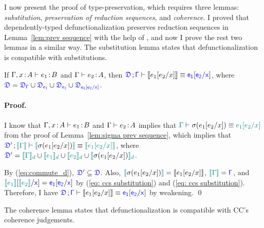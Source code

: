 
I now present the proof of type-preservation, which requires three lemmas: \textit{substitution}, \textit{preservation of reduction sequences}, and \textit{coherence}. I proved that dependently-typed defunctionalization preserves reduction sequences in Lemma~\ref{lem:prev sequence} with the help of {\ccs}, and now I prove the rest two lemmas in a similar way. The substitution lemma states that defunctionalization is compatible with substitutions.

\begin{lemma}[Substitution] 

If $\Gamma, x \hspace{0.5mm}{:}\hspace{0.5mm} A \vdash e_1 \hspace{0.5mm}{:}\hspace{0.5mm} B$ and $\Gamma \vdash e_2 \hspace{0.5mm}{:}\hspace{0.5mm} A$, then $\target{\fdef} \semicolon \target{\Gamma} \vdash \bbracket{e_1 \sub{e_2}{x}} \equiv \target{e_1}\sub{\target{e_2}}{\target{x}}$, where $\target{\fdef} = \target{\fdef_{\Gamma}} \cup \target{\fdef_{e_1}} \cup \target{\fdef_{e_2}} \cup \target{\fdef_{e_1\sub{e_2}{x}}}$.
\paragraph{Proof.} I know that $\Gamma, x \hspace{0.5mm}{:}\hspace{0.5mm} A \vdash e_1 \hspace{0.5mm}{:}\hspace{0.5mm} B$ and $\Gamma \vdash e_2 \hspace{0.5mm}{:}\hspace{0.5mm} A$ implies that $\color{teal}{\Gamma}\color{black} \vdash \sigma(e_1[e_2\slash x]) \equiv \color{teal}{e_1[e_2\slash x]}\color{black}$ from the proof of Lemma~\ref{lem:sigma prev sequence}, which implies that $\target{\fdef'} \semicolon \hbracket{\helper{\Gamma}} \vdash \hbracket{\sigma(e_1\sub{e_2}{x})} \equiv \hbracket{\helper{e_1\sub{e_2}{x}}}$, where 
$\target{\fdef'} = \hbracketd{\helper{\Gamma}} \cup \hbracketd{\helper{e_1}} \cup \hbracketd{\helper{e_2}} \cup \hbracketd{\sigma(e_1\sub{e_2}{x})}$.

By (\ref{eq:commute_d}), $\target{\fdef'} \subseteq \target{\fdef}$. Also, $\color{teal}{[\![}\color{black}{\sigma(e_1[e_2\slash x])}\color{teal}{]\!]}\color{black} = {[\![ e_1[e_2\slash x] ]\!]}$, $\hbracket{\helper{\Gamma}} = \target{\Gamma}$, and $\hbracket{\helper{e_1}}\sub{\hbracket{\helper{e_2}}}{\target{x}} = \target{e_1}\targetsub{e_2}{x}$ by (\ref{eq: ccs substitution}) and (\ref{eq: ccs substitution}). Therefore, I have $\target{\fdef} \semicolon \target{\Gamma} \vdash \bbracket{e_1 \sub{e_2}{x}} \equiv \target{e_1}\sub{\target{e_2}}{\target{x}}$ by weakening. \qed
\label{lem:sub}
\end{lemma}

The coherence lemma states that defunctionalization is compatible with CC's coherence judgements.

